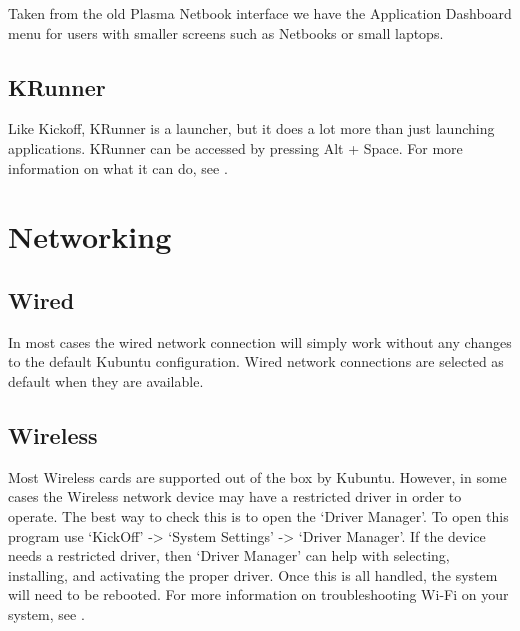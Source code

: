 \documentclass[letterpaper,10pt,english]{sphinxmanual}
\begin{document}
Taken from the old Plasma Netbook interface we have the Application Dashboard menu for users with smaller screens such as Netbooks or small laptops.


\subsection{KRunner}
\label{\detokenize{docs/basic:krunner}}

Like Kickoff, KRunner is a launcher, but it does a lot more than just launching applications. KRunner can be accessed by pressing Alt + Space. For more information on what it can do, see .


\section{Networking}
\label{\detokenize{docs/basic:networking}}


\subsection{Wired}
\label{\detokenize{docs/basic:wired}}
In most cases the wired network connection will simply work without any changes to the default Kubuntu configuration. Wired network connections are selected as default when they are available.


\subsection{Wireless}
\label{\detokenize{docs/basic:wireless}}
Most Wireless cards are supported out of the box by Kubuntu. However, in some cases the Wireless network device may have a restricted driver in order to operate. The best way to check this is to open the ‘Driver Manager’. To open this program use ‘KickOff’ -\textgreater{} ‘System Settings’ -\textgreater{} ‘Driver Manager’. If the device needs a restricted driver, then ‘Driver Manager’ can help with selecting, installing, and activating the proper driver. Once this is all handled, the system will need to be rebooted. For more information on troubleshooting Wi-Fi on your system, see .
\end{document}
